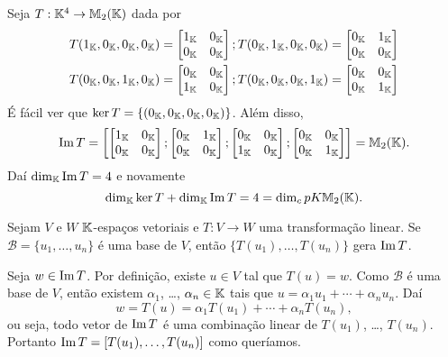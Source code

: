 \begin{exemplo}
	Seja $T : \mathbb{K}^4 \to \mathbb{M}_2(\mathbb{K})$ dada por
	\begin{align*}
		T(1_{\mathbb{K}},0_{\mathbb{K}},0_{\mathbb{K}},0_{\mathbb{K}}) &= \begin{bmatrix}
			1_{\mathbb{K}} & 0_{\mathbb{K}}\\
			0_{\mathbb{K}} & 0_{\mathbb{K}}
		\end{bmatrix}; T(0_{\mathbb{K}},1_{\mathbb{K}},0_{\mathbb{K}},0_{\mathbb{K}}) = \begin{bmatrix}
			0_{\mathbb{K}} & 1_{\mathbb{K}}\\
			0_{\mathbb{K}} & 0_{\mathbb{K}}
		\end{bmatrix}\\
		T(0_{\mathbb{K}},0_{\mathbb{K}},1_{\mathbb{K}},0_{\mathbb{K}}) &= \begin{bmatrix}
			0_{\mathbb{K}} & 0_{\mathbb{K}}\\
			1_{\mathbb{K}} & 0_{\mathbb{K}}
		\end{bmatrix}; T(0_{\mathbb{K}},0_{\mathbb{K}},0_{\mathbb{K}},1_{\mathbb{K}}) = \begin{bmatrix}
			0_{\mathbb{K}} & 0_{\mathbb{K}}\\
			0_{\mathbb{K}} & 1_{\mathbb{K}}
		\end{bmatrix}\\
	\end{align*}
	É fácil ver que $\ker T = \{(0_{\mathbb{K}},0_{\mathbb{K}},0_{\mathbb{K}},0_{\mathbb{K}})\}$. Além disso,
	\[
		{\rm Im\,} T = \left[\begin{bmatrix}
			1_{\mathbb{K}} & 0_{\mathbb{K}}\\
			0_{\mathbb{K}} & 0_{\mathbb{K}}
		\end{bmatrix};\begin{bmatrix}
			0_{\mathbb{K}} & 1_{\mathbb{K}}\\
			0_{\mathbb{K}} & 0_{\mathbb{K}}
		\end{bmatrix};\begin{bmatrix}
			0_{\mathbb{K}} & 0_{\mathbb{K}}\\
			1_{\mathbb{K}} & 0_{\mathbb{K}}
		\end{bmatrix};\begin{bmatrix}
			0_{\mathbb{K}} & 0_{\mathbb{K}}\\
			0_{\mathbb{K}} & 1_{\mathbb{K}}
		\end{bmatrix}\right] = \mathbb{M}_2(\mathbb{K}).
	\]
	Daí $\dim_{\mathbb{K}}{\rm Im\,} T = 4$ e novamente
	\[
		\dim_{\mathbb{K}}\ker T + \dim_{\mathbb{K}}{\rm Im\,} T = 4 = \dim_cp{K}\mathbb{M}_2(\mathbb{K}).
	\]
\end{exemplo}

\begin{lema}\label{transformacao_gera_imagem}
	Sejam $V$ e $W$ $\mathbb{K}$-espaços vetoriais e $T : V \to W$ uma transformação linear. Se $\mathcal{B} = \{u_1, \dots, u_n\}$ é uma base de $V$, então $\{T(u_1), \dots, T(u_n)\}$ gera ${\rm Im\,} T$.
\end{lema}
\begin{prova}
	Seja $w \in {\rm Im\,} T$. Por definição, existe $u \in V$ tal que $T(u) = w$. Como $\mathcal{B}$ é uma base de $V$, então existem $\alpha_1$, \dots, $\alpha_n \in \mathbb{K}$ tais que $u = \alpha_1u_1 + \cdots + \alpha_nu_n$. Daí
	\[
		w = T(u) = \alpha_1T(u_1) + \cdots + \alpha_nT(u_n),
	\]
	ou seja, todo vetor de ${\rm Im\,} T$ é uma combinação linear de $T(u_1)$, \dots, $T(u_n)$. Portanto ${\rm Im\,} T = [T(u_1), \dots, T(u_n)]$ como queríamos.
\end{prova}

